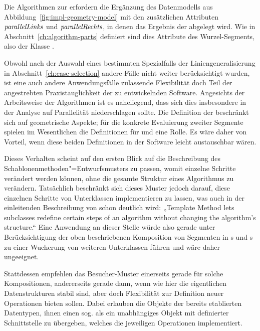 \documentclass[../main/thesis.tex]{subfiles}
\begin{document}
Die Algorithmen zur  erfordern die Ergänzung des Datenmodells aus Abbildung~\ref{fig:impl-geometry-model} mit den zusätzlichen Attributen $\relation{parallelLinks}$ und $\relation{parallelRechts}$, in denen das Ergebnis der  abgelegt wird.
Wie in Abschnitt~\ref{ch:algorithm-parts} definiert sind dies Attribute des Wurzel-Segments, also der Klasse .

Obwohl nach der Auswahl eines bestimmten Spezialfalls der Liniengeneralisierung in Abschnitt~\ref{ch:case-selection} andere Fälle nicht weiter berücksichtigt wurden, ist eine auch andere Anwendungsfälle zulassende Flexibilität doch Teil der angestrebten Praxistauglichkeit der zu entwickelnden Software.
Angesichts der Arbeitsweise der Algorithmen ist es naheliegend, dass sich dies insbesondere in der Analyse auf Parallelität niederschlagen sollte.
Die Definition der  beschränkt sich auf geometrische Aspekte; für die konkrete Evaluierung zweiter Segmente spielen im Wesentlichen die Definitionen für  und  eine Rolle.
Es wäre daher von Vorteil, wenn diese beiden Definitionen in der Software leicht austauschbar wären.

Dieses Verhalten scheint auf den ersten Blick auf die Beschreibung des Schablonenmethoden"=Entwurfsmusters  zu passen, womit einzelne Schritte verändert werden können, ohne die gesamte Struktur eines Algorithmus zu verändern.
Tatsächlich beschränkt sich dieses Muster jedoch darauf, diese einzelnen Schritte von Unterklassen implementieren zu lassen, was auch in der einleitenden Beschreibung von \citeauthor{GHJV95} schon deutlich wird:
„Template Method lets subclasses redefine certain steps of an algorithm without changing the algorithm's structure.“ 
Eine Anwendung an dieser Stelle würde also gerade unter Berücksichtigung der oben beschriebenen Komposition von Segmenten in s und s zu einer Wucherung von weiteren Unterklassen führen und wäre daher ungeeignet.

Stattdessen empfehlen \citeauthor{GHJV95} das Besucher-Muster  einerseits gerade für solche Kompositionen, andererseits gerade dann, wenn wie hier die eigentlichen Datenstrukturen stabil sind, aber doch Flexibilität zur Definition neuer Operationen bieten sollen. 
Dabei erlauben die Objekte der bereits etablierten Datentypen, ihnen einen sog.  als ein unabhängiges Objekt mit definierter Schnittstelle zu übergeben, welches die jeweiligen Operationen implementiert. 
\end{document}
